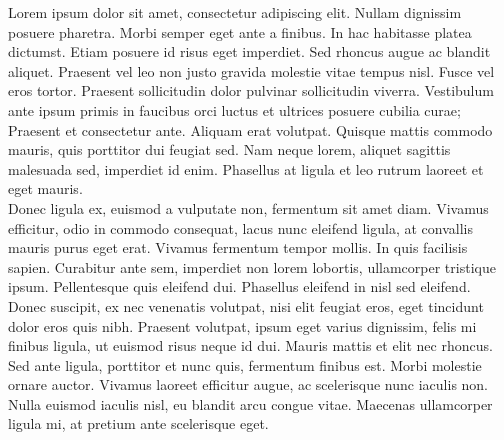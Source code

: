 \noindent Lorem ipsum dolor sit amet, consectetur adipiscing elit. Nullam dignissim posuere pharetra. Morbi semper eget ante a finibus. In hac habitasse platea dictumst. Etiam posuere id risus eget imperdiet. Sed rhoncus augue ac blandit aliquet. Praesent vel leo non justo gravida molestie vitae tempus nisl. Fusce vel eros tortor. Praesent sollicitudin dolor pulvinar sollicitudin viverra. Vestibulum ante ipsum primis in faucibus orci luctus et ultrices posuere cubilia curae; Praesent et consectetur ante. Aliquam erat volutpat. Quisque mattis commodo mauris, quis porttitor dui feugiat sed. Nam neque lorem, aliquet sagittis malesuada sed, imperdiet id enim. Phasellus at ligula et leo rutrum laoreet et eget mauris. \\

\noindent Donec ligula ex, euismod a vulputate non, fermentum sit amet diam. Vivamus efficitur, odio in commodo consequat, lacus nunc eleifend ligula, at convallis mauris purus eget erat. Vivamus fermentum tempor mollis. In quis facilisis sapien. Curabitur ante sem, imperdiet non lorem lobortis, ullamcorper tristique ipsum. Pellentesque quis eleifend dui. Phasellus eleifend in nisl sed eleifend. \\

Donec suscipit, ex nec venenatis volutpat, nisi elit feugiat eros, eget tincidunt dolor eros quis nibh. Praesent volutpat, ipsum eget varius dignissim, felis mi finibus ligula, ut euismod risus neque id dui. Mauris mattis et elit nec rhoncus. Sed ante ligula, porttitor et nunc quis, fermentum finibus est. Morbi molestie ornare auctor. Vivamus laoreet efficitur augue, ac scelerisque nunc iaculis non. Nulla euismod iaculis nisl, eu blandit arcu congue vitae. Maecenas ullamcorper ligula mi, at pretium ante scelerisque eget.

